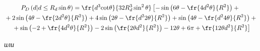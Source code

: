 \vspace*{-6pt}





\noindent


  \begin{multline*}


  P_D\left( d\vert d\leq R_d\sin\theta\right) 


=\fr{d^3\mathrm{cot}\theta}{32R_d^3\sin^2\theta} \left[ -\sin \left( 6\theta-


\fr{4d^2\theta}{R^2}\right) +{}\right.\\


{}+ 2\sin \left( 4\theta-


\fr{2d^2\theta}{R^2}\right)+


4\sin \left(2\theta-\fr{d^22\theta}{R^2}\right) +\sin\left( 4\theta-


\fr{d^24\theta}{R^2}\right) +{}\\


  \left.{}+\sin \left( -2+\fr{4d^2\theta}{R^2}\right) -2\sin \left( 


\fr{2\theta d^2}{R^2}\right) -12\theta +6\pi +\fr{12\theta d^2}{R^2}\right]




  \end{multline*}


  \textit{или}


  


  \vspace*{-6pt}


  


  \noindent


